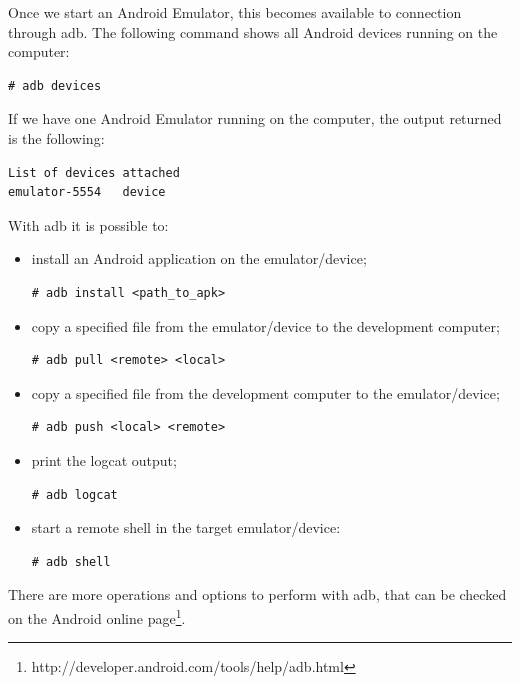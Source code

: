 Once we start an Android Emulator, this becomes available to connection through adb. The following command shows all Android devices running on the computer:

 \begin{lstlisting}[style=BashInputStyle]
# adb devices
\end{lstlisting}

If we have one Android Emulator running on the computer, the output returned is the following:

 \begin{lstlisting}[style=BashInputStyle]
List of devices attached 
emulator-5554	device
\end{lstlisting}

With adb it is possible to:

\begin{itemize}

\item install an Android application on the emulator/device;
 \begin{lstlisting}[style=BashInputStyle]
# adb install <path_to_apk>
\end{lstlisting}

\item copy a specified file from the emulator/device to the development computer;
 \begin{lstlisting}[style=BashInputStyle]
# adb pull <remote> <local>
\end{lstlisting}

\item copy a specified file from the development computer to the emulator/device;
 \begin{lstlisting}[style=BashInputStyle]
# adb push <local> <remote>
\end{lstlisting}

\item print the logcat output;
 \begin{lstlisting}[style=BashInputStyle]
# adb logcat
\end{lstlisting}

\item start a remote shell in the target emulator/device:
 \begin{lstlisting}[style=BashInputStyle]
# adb shell
\end{lstlisting}

\end{itemize}

There are more operations and options to perform with adb, that can be checked on the Android online page\footnote{http://developer.android.com/tools/help/adb.html}.